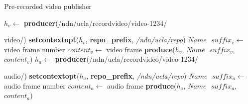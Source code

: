 \begin{algorithm}[hbtp]
\caption{Pre-recorded video publisher}
\label{alg:recordproducer}
\begin{algorithmic}[3]
\State $h_v \leftarrow $ \textbf{producer}(/ndn/ucla/recordvideo/video-1234/

video/)
\State \textbf{setcontextopt}($h_v$, \textbf{repo\_prefix}, \textit{/ndn/ucla/repo})
\vspace{0.2cm}
	\State $Name \textbf{ } suffix_v \leftarrow $ video frame number
	\State $content_v \leftarrow $ video frame
	\State \textbf{produce}($h_v$, $Name\textbf{ }suffix_v$, $content_v$)
	\EndWhile
\vspace{0.2cm}
\vspace{0.2cm}
\State $h_a \leftarrow $ \textbf{producer}(/ndn/ucla/recordvideo/video-1234/

audio/)
\State \textbf{setcontextopt}($h_a$, \textbf{repo\_prefix}, \textit{/ndn/ucla/repo})
\vspace{0.2cm}
	\State $Name \textbf{ } suffix_a \leftarrow $ audio frame number
	\State $content_a \leftarrow $ audio frame
	\State \textbf{produce}($h_a$, $Name\textbf{ }suffix_a$, $content_a$)
	\EndWhile
\end{algorithmic}
\end{algorithm}


